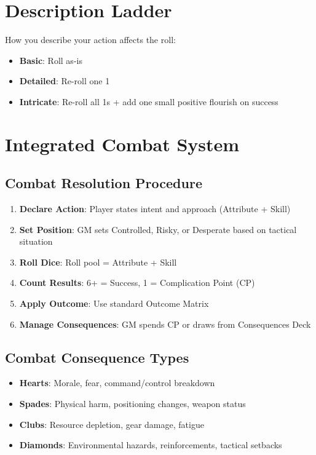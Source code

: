 \documentclass[11pt]{article}
\begin{document}
\section{Description Ladder}

How you describe your action affects the roll:

\begin{itemize}
    \item \textbf{Basic}: Roll as-is
    \item \textbf{Detailed}: Re-roll one 1
    \item \textbf{Intricate}: Re-roll all 1s + add one small positive flourish on success
\end{itemize}

\section{Integrated Combat System}

\subsection{Combat Resolution Procedure}
\begin{enumerate}
    \item \textbf{Declare Action}: Player states intent and approach (Attribute + Skill)
    \item \textbf{Set Position}: GM sets Controlled, Risky, or Desperate based on tactical situation
    \item \textbf{Roll Dice}: Roll pool = Attribute + Skill
    \item \textbf{Count Results}: 6+ = Success, 1 = Complication Point (CP)
    \item \textbf{Apply Outcome}: Use standard Outcome Matrix
    \item \textbf{Manage Consequences}: GM spends CP or draws from Consequences Deck
\end{enumerate}

\subsection{Combat Consequence Types}
\begin{itemize}
    \item \textbf{Hearts}: Morale, fear, command/control breakdown
    \item \textbf{Spades}: Physical harm, positioning changes, weapon status
    \item \textbf{Clubs}: Resource depletion, gear damage, fatigue
    \item \textbf{Diamonds}: Environmental hazards, reinforcements, tactical setbacks
\end{itemize}
\end{document}
